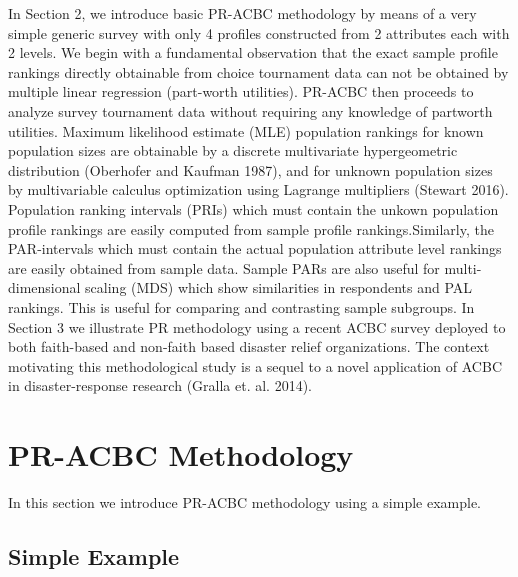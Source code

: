 \documentclass[a4paper, 12pt]{article}
\begin{document}
In Section 2, we introduce basic PR-ACBC methodology by means of a very simple generic survey with only 4 profiles constructed from 2 attributes each with 2 levels. We begin with a fundamental observation that the exact sample profile rankings directly obtainable from choice tournament data can not be obtained by multiple linear regression (part-worth utilities).  PR-ACBC then proceeds to analyze  survey tournament data without requiring any knowledge of partworth utilities.  Maximum likelihood estimate (MLE) population rankings for known population sizes are obtainable by a discrete multivariate hypergeometric distribution (Oberhofer and Kaufman 1987), and  for unknown population sizes by multivariable calculus optimization using Lagrange multipliers (Stewart 2016).   Population ranking intervals (PRIs) which must contain the unkown population profile rankings are easily computed from sample profile rankings.Similarly, the PAR-intervals which must contain the actual population attribute level rankings are easily obtained from sample data.   Sample PARs are also useful for multi-dimensional scaling (MDS) which show similarities in respondents and PAL rankings. This is useful for comparing and contrasting sample subgroups.  In Section 3 we illustrate PR methodology using a recent ACBC survey deployed to both faith-based and non-faith based disaster relief organizations.    The context motivating this methodological study is a sequel to a novel application of ACBC in disaster-response research (Gralla et. al. 2014).



\section{PR-ACBC Methodology}
In this section we introduce PR-ACBC methodology using a simple example.

\subsection{Simple Example}
\end{document}
